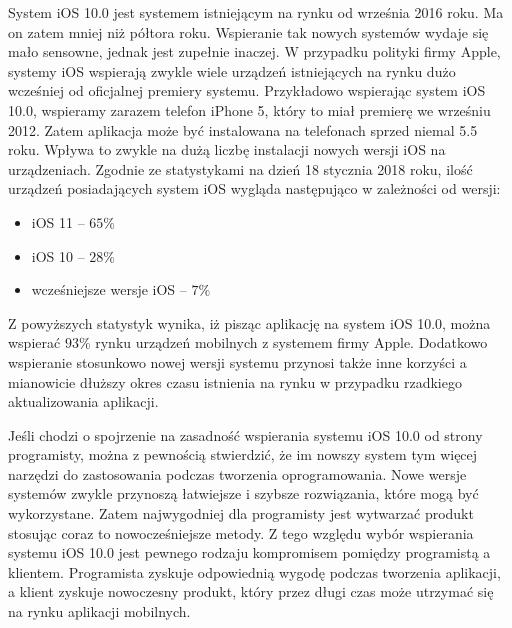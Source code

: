 \documentclass[twoside]{projektInzynierskiMS}
\begin{document}
System iOS 10.0 jest systemem istniejącym na rynku od września 2016 roku. Ma on zatem mniej niż półtora roku. Wspieranie tak nowych systemów wydaje się mało sensowne, jednak jest zupełnie inaczej. W przypadku polityki firmy Apple, systemy iOS wspierają zwykle wiele urządzeń istniejących na rynku dużo wcześniej od oficjalnej premiery systemu. Przykładowo wspierając system iOS 10.0, wspieramy zarazem telefon iPhone 5, który to miał premierę we wrześniu 2012. Zatem aplikacja może być instalowana na telefonach sprzed niemal 5.5 roku. Wpływa to zwykle na dużą liczbę instalacji nowych wersji iOS na urządzeniach. Zgodnie ze statystykami na dzień 18 stycznia 2018 roku, ilość urządzeń posiadających system iOS wygląda następująco w zależności od wersji:
\begin{itemize}
\item iOS 11 -- $65\%$
\item iOS 10 -- $28\%$
\item wcześniejsze wersje iOS -- $7\%$
\end{itemize}

Z powyższych statystyk wynika, iż pisząc aplikację na system iOS 10.0, można wspierać $93\%$ rynku urządzeń mobilnych z systemem firmy Apple. Dodatkowo wspieranie stosunkowo nowej wersji systemu przynosi także inne korzyści a mianowicie dłuższy okres czasu istnienia na rynku w przypadku rzadkiego aktualizowania aplikacji.

Jeśli chodzi o spojrzenie na zasadność wspierania systemu iOS 10.0 od strony programisty, można z pewnością stwierdzić, że im nowszy system tym więcej narzędzi do zastosowania podczas tworzenia oprogramowania. Nowe wersje systemów zwykle przynoszą łatwiejsze i szybsze rozwiązania, które mogą być wykorzystane. Zatem najwygodniej dla programisty jest wytwarzać produkt stosując coraz to nowocześniejsze metody. Z tego względu wybór wspierania systemu iOS 10.0 jest pewnego rodzaju kompromisem pomiędzy programistą a klientem. Programista zyskuje odpowiednią wygodę podczas tworzenia aplikacji, a klient zyskuje nowoczesny produkt, który przez długi czas może utrzymać się na rynku aplikacji mobilnych.
\end{document}
